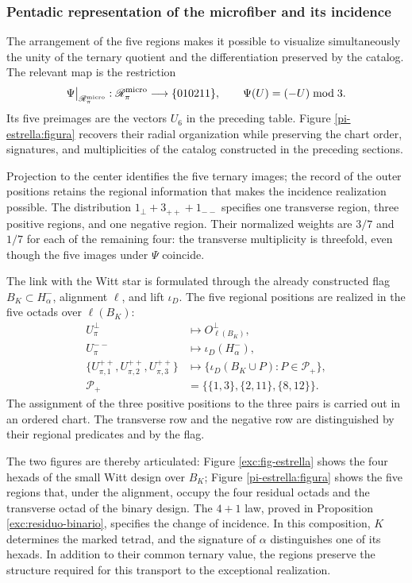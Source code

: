 \subsubsection{Pentadic representation of the microfiber and its incidence}
\label{pi-estrella:desarrollo}

The arrangement of the five regions makes it possible to visualize
simultaneously the unity of the ternary quotient and the differentiation
preserved by the catalog. The relevant map is the restriction
\[
 \Psi\big|_{\mathscr R_\pi^{\rm micro}}:
 \mathscr R_\pi^{\rm micro}\longrightarrow\{010211\},
 \qquad \Psi(U)=(-U)\bmod3.
\]
Its five preimages are the vectors \(U_6\) in the preceding table.
Figure \ref{pi-estrella:figura} recovers their radial organization while
preserving the chart order, signatures, and multiplicities of the catalog
constructed in the preceding sections.



Projection to the center identifies the five ternary images; the record of
the outer positions retains the regional information that makes the
incidence realization possible. The distribution
\(1_\perp+3_{++}+1_{--}\) specifies one transverse region, three positive
regions, and one negative region. Their normalized weights are \(3/7\) and
\(1/7\) for each of the remaining four: the transverse multiplicity is
threefold, even though the five images under \(\Psi\) coincide.

The link with the Witt star is formulated through the already constructed
flag \(B_K\subset H^-_\alpha\), alignment \(\ell\), and lift \(\iota_D\).
The five regional positions are realized in the five octads over
\(\ell(B_K)\):
\[
\begin{aligned}
 U_\pi^\perp&\longmapsto O^\perp_{\ell(B_K)},\\
 U_\pi^{--}&\longmapsto\iota_D(H^-_\alpha),\\
 \{U_{\pi,1}^{++},U_{\pi,2}^{++},U_{\pi,3}^{++}\}
 &\longmapsto
 \{\iota_D(B_K\cup P):P\in\mathcal P_+\},\\
 \mathcal P_+&=\bigl\{\{1,3\},\{2,11\},\{8,12\}\bigr\}.
\end{aligned}
\]
The assignment of the three positive positions to the three pairs is carried
out in an ordered chart. The transverse row and the negative row are
distinguished by their regional predicates and by the flag.

The two figures are thereby articulated: Figure \ref{exc:fig-estrella} shows
the four hexads of the small Witt design over \(B_K\); Figure
\ref{pi-estrella:figura} shows the five regions that, under the alignment,
occupy the four residual octads and the transverse octad of the binary design.
The \(4+1\) law, proved in Proposition \ref{exc:residuo-binario}, specifies
the change of incidence. In this composition, \(K\) determines the marked
tetrad, and the signature of \(\alpha\) distinguishes one of its hexads. In
addition to their common ternary value, the regions preserve the structure
required for this transport to the exceptional realization.
